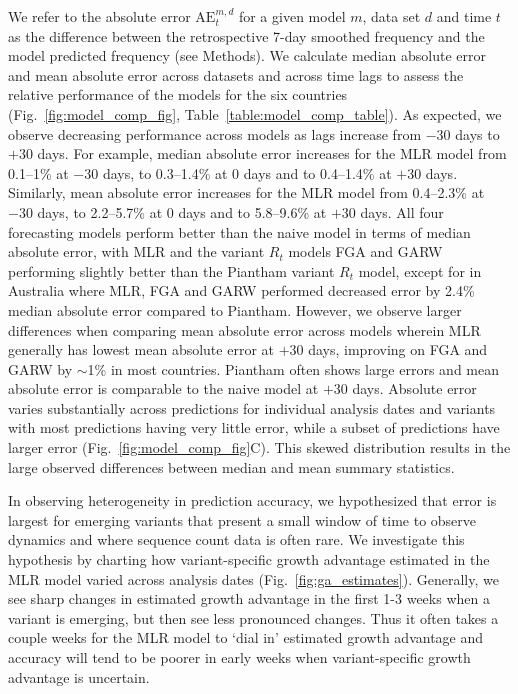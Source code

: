 \documentclass[11pt,oneside,letterpaper]{article}
\begin{document}
We refer to the absolute error $\mathrm{AE}_{t}^{m,d}$ for a given model $m$, data set $d$ and time $t$ as the difference between the retrospective 7-day smoothed frequency and the model predicted frequency (see Methods).
We calculate median absolute error and mean absolute error across datasets and across time lags to assess the relative performance of the models for the six countries (Fig.~\ref{fig:model_comp_fig}, Table~\ref{table:model_comp_table}).
As expected, we observe decreasing performance across models as lags increase from $-30$ days to $+30$ days.
For example, median absolute error increases for the MLR model from 0.1--1\% at $-30$ days, to 0.3--1.4\% at 0 days and to 0.4--1.4\% at $+30$ days.
Similarly, mean absolute error increases for the MLR model from 0.4--2.3\% at $-30$ days, to 2.2--5.7\% at 0 days and to 5.8--9.6\% at $+30$ days.
All four forecasting models perform better than the naive model in terms of median absolute error, with MLR and the variant $R_t$ models FGA and GARW performing slightly better than the Piantham variant $R_t$ model, except for in Australia where MLR, FGA and GARW performed decreased error by 2.4\% median absolute error compared to Piantham.
However, we observe larger differences when comparing mean absolute error across models wherein MLR generally has lowest mean absolute error at $+30$ days, improving on FGA and GARW by $\sim$1\% in most countries.
Piantham often shows large errors and mean absolute error is comparable to the naive model at $+30$ days.
Absolute error varies substantially across predictions for individual analysis dates and variants with most predictions having very little error, while a subset of predictions have larger error (Fig.~\ref{fig:model_comp_fig}C).
This skewed distribution results in the large observed differences between median and mean summary statistics.

In observing heterogeneity in prediction accuracy, we hypothesized that error is largest for emerging variants that present a small window of time to observe dynamics and where sequence count data is often rare.
We investigate this hypothesis by charting how variant-specific growth advantage estimated in the MLR model varied across analysis dates (Fig.~\ref{fig:ga_estimates}).
Generally, we see sharp changes in estimated growth advantage in the first 1-3 weeks when a variant is emerging, but then see less pronounced changes.
Thus it often takes a couple weeks for the MLR model to `dial in' estimated growth advantage and accuracy will tend to be poorer in early weeks when variant-specific growth advantage is uncertain.
\end{document}
